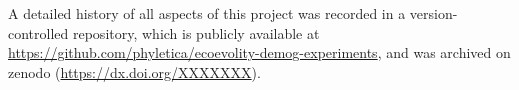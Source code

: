 A detailed history of all aspects of this project was recorded in a
version-controlled repository, which is publicly available at
\url{https://github.com/phyletica/ecoevolity-demog-experiments},
and was archived on zenodo
(\url{https://dx.doi.org/XXXXXXX}).
